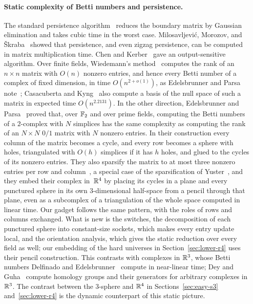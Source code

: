 \paragraph{Static complexity of Betti numbers and persistence.}
The standard persistence algorithm~\cite{ELZ02,ZC05} reduces the boundary matrix by Gaussian elimination and takes cubic time in the worst case.
Milosavljevi\'c, Morozov, and \v{S}kraba~\cite{MMS11} showed that persistence, and even zigzag persistence, can be computed in matrix multiplication time.
Chen and Kerber~\cite{CK13} gave an output-sensitive algorithm.
Over finite fields, Wiedemann's method~\cite{Wie86,KS91} computes the rank of an $n\times n$ matrix with $O(n)$ nonzero entries, and hence every Betti number of a complex of fixed dimension, in time $O(n^{2+o(1)})$, as Edelsbrunner and Parsa note~\cite{EP14}; Casacuberta and Kyng~\cite{CK22} also compute a basis of the null space of such a matrix in expected time $O(n^{2.2131})$.
In the other direction, Edelsbrunner and Parsa~\cite{EP14} proved that, over $\mathbb{F}_2$ and over prime fields, computing the Betti numbers of a $2$-complex with $N$ simplices has the same complexity as computing the rank of an $N\times N$ $0/1$ matrix with $N$ nonzero entries.
In their construction every column of the matrix becomes a cycle, and every row becomes a sphere with holes, triangulated with $O(h)$ simplices if it has $h$ holes, and glued to the cycles of its nonzero entries.
They also sparsify the matrix to at most three nonzero entries per row and column~\cite[Theorem~4.1]{EP14}, a special case of the sparsification of Yuster~\cite{Yus08}, and they embed their complex in~$\mathbb{R}^4$ by placing its cycles in a plane and every punctured sphere in its own $3$-dimensional half-space from a pencil through that plane, even as a subcomplex of a triangulation of the whole space computed in linear time.
Our gadget follows the same pattern, with the roles of rows and columns exchanged.
What is new is the switches, the decomposition of each punctured sphere into constant-size sockets, which makes every entry update local, and the orientation analysis, which gives the static reduction over every field as well; our embedding of the hard universes in Section~\ref{sec:lower-r4} uses their pencil construction.
This contrasts with complexes in $\mathbb{R}^3$, whose Betti numbers Delfinado and Edelsbrunner~\cite{DE95} compute in near-linear time; Dey and Guha~\cite{DG98} compute homology groups and their generators for arbitrary complexes in $\mathbb{R}^3$.
The contrast between the $3$-sphere and $\mathbb{R}^4$ in Sections~\ref{sec:easy-s3} and~\ref{sec:lower-r4} is the dynamic counterpart of this static picture.
